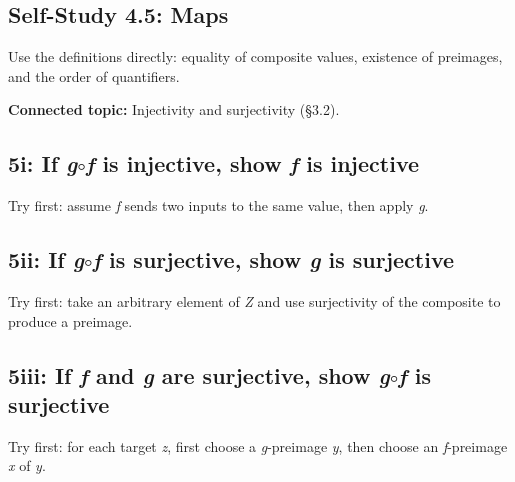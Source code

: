 \documentclass[11pt]{article}
\begin{document}
\begin{keepsection}
\section{Self-Study 4.5: Maps}

Use the definitions directly: equality of composite values, existence of preimages, and the order of quantifiers.

\textbf{Connected topic:} Injectivity and surjectivity (§3.2).

\begin{keepsection}
\subsection{5i: If \textit{g}\ensuremath{\circ}\textit{f} is injective, show \textit{f} is injective}

Try first: assume \textit{f} sends two inputs to the same value, then apply \textit{g}.

\end{keepsection}

\begin{keepsection}
\subsection{5ii: If \textit{g}\ensuremath{\circ}\textit{f} is surjective, show \textit{g} is surjective}

Try first: take an arbitrary element of \textit{Z} and use surjectivity of the composite to produce a preimage.

\end{keepsection}

\begin{keepsection}
\subsection{5iii: If \textit{f} and \textit{g} are surjective, show \textit{g}\ensuremath{\circ}\textit{f} is surjective}

Try first: for each target \textit{z}, first choose a \textit{g}-preimage \textit{y}, then choose an \textit{f}-preimage \textit{x} of \textit{y}.


\end{keepsection}
\end{keepsection}
\end{document}
